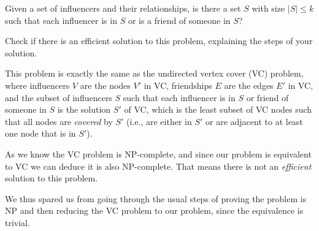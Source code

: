 {Given a set of influencers and their relationships, is there a set $S$ with size $|S| \leq k$ such that each influencer is in $S$ or is a friend of someone in $S$?

Check if there is an efficient solution to this problem, explaining the steps of your solution.

\ansseparator

This problem is exactly the same as the undirected vertex cover (VC) problem, where influencers $V$ are the nodes $V'$ in VC, friendships $E$ are the edges $E'$ in VC, and the subset of influencers $S$ such that each influencer is in $S$ or friend of someone in $S$ is the solution $S'$ of VC, which is the least subset of VC nodes such that all nodes are \emph{covered} by $S'$ (i.e., are either in $S'$ or are adjacent to at least one node that is in $S'$).

As we know the VC problem is NP-complete, and since our problem is equivalent to VC we can deduce it is also NP-complete. That means there is not an \emph{efficient} solution to this problem.

We thus spared us from going through the usual steps of proving the problem is NP and then reducing the VC problem to our problem, since the equivalence is trivial.

}
